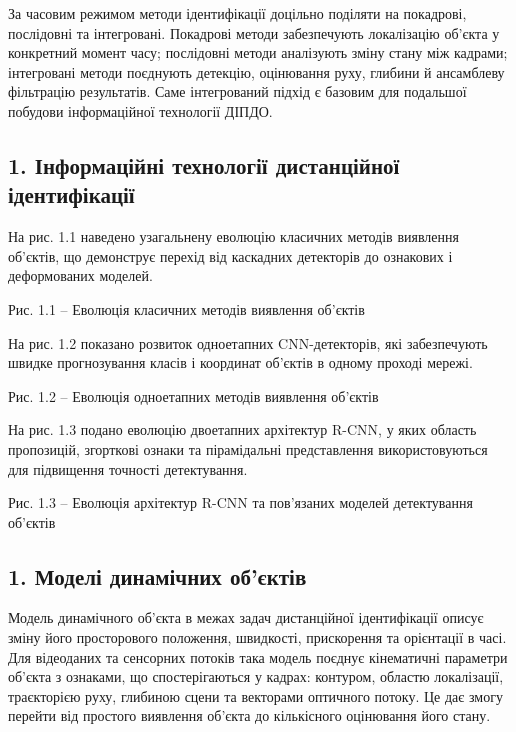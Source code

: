 \documentclass[
]{article}
\begin{document}
За часовим режимом методи ідентифікації доцільно поділяти на покадрові, послідовні та інтегровані. Покадрові методи забезпечують локалізацію об'єкта у конкретний момент часу; послідовні методи аналізують зміну стану між кадрами; інтегровані методи поєднують детекцію, оцінювання руху, глибини й ансамблеву фільтрацію результатів. Саме інтегрований підхід є базовим для подальшої побудови інформаційної технології ДІПДО.

\subsection{1. Інформаційні технології дистанційної ідентифікації}\label{ux456ux43dux444ux43eux440ux43cux430ux446ux456ux439ux43dux456-ux442ux435ux445ux43dux43eux43bux43eux433ux456ux457-ux434ux438ux441ux442ux430ux43dux446ux456ux439ux43dux43eux457-ux456ux434ux435ux43dux442ux438ux444ux456ux43aux430ux446ux456ux457}

На рис. 1.1 наведено узагальнену еволюцію класичних методів виявлення об'єктів, що демонструє перехід від каскадних детекторів до ознакових і деформованих моделей.

Рис. 1.1 -- Еволюція класичних методів виявлення об'єктів

На рис. 1.2 показано розвиток одноетапних CNN-детекторів, які забезпечують швидке прогнозування класів і координат об'єктів в одному проході мережі.

Рис. 1.2 -- Еволюція одноетапних методів виявлення об'єктів

На рис. 1.3 подано еволюцію двоетапних архітектур R-CNN, у яких область пропозицій, згорткові ознаки та пірамідальні представлення використовуються для підвищення точності детектування.

Рис. 1.3 -- Еволюція архітектур R-CNN та пов'язаних моделей детектування об'єктів

\subsection{1. Моделі динамічних об'єктів}\label{ux43cux43eux434ux435ux43bux456-ux434ux438ux43dux430ux43cux456ux447ux43dux438ux445-ux43eux431ux454ux43aux442ux456ux432}

Модель динамічного об'єкта в межах задач дистанційної ідентифікації описує зміну його просторового положення, швидкості, прискорення та орієнтації в часі. Для відеоданих та сенсорних потоків така модель поєднує кінематичні параметри об'єкта з ознаками, що спостерігаються у кадрах: контуром, областю локалізації, траєкторією руху, глибиною сцени та векторами оптичного потоку. Це дає змогу перейти від простого виявлення об'єкта до кількісного оцінювання його стану.
\end{document}

